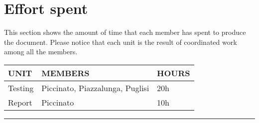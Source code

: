 \documentclass{Configuration_Files/Template}
\begin{document}
\chapter{Effort spent}

This section shows the amount of time that each member has spent to produce the document. Please notice that each unit is the result of coordinated work among all the members.

\begin{table}[h]
\centering
\begin{tabularx}{\textwidth}{| X | X | X |}
\hline
\textbf{UNIT} & \textbf{MEMBERS} & \textbf{HOURS} \\ [1ex]
\hline
Testing & Piccinato, Piazzalunga, Puglisi & 20h \\ [1ex]
\hline
Report & Piccinato & 10h \\ [1ex]
\hline
\end{tabularx}
\end{table}

{\color{bluepoli}\rule{\linewidth}{0.1pt}}
\end{document}
